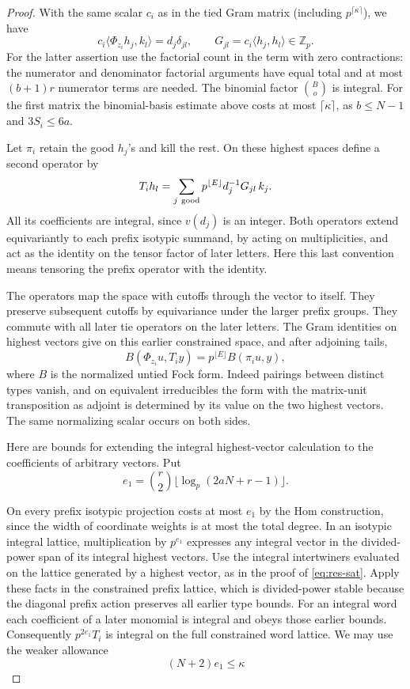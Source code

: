 \begin{proof}
With the same scalar \(c_i\) as in the tied Gram matrix
(including \(p^{\lceil\kappa\rceil}\)), we have
\[
 c_i \langle\Phi_{z_i}h_j,k_l\rangle=d_j\delta_{jl},
 \qquad G_{jl}=c_i\langle h_j,h_l\rangle\in\mathbb Z_p.
\]
For the latter assertion use the factorial count in the term
with zero contractions: the numerator and denominator factorial
arguments have equal total and at most \((b+1)r\) numerator
terms are needed. The binomial factor \(\binom Bo\) is integral.
For the first matrix the binomial-basis estimate above costs at
most \(\lceil\kappa\rceil\), as \(b\le N-1\) and \(3S_i\le6a\).

Let \(\pi_i\) retain the good \(h_j\)'s and kill the rest.
On these highest spaces define a second operator by
\[
            T_i h_l=\sum_{j\ {\rm good}}
                   p^{\lfloor E\rfloor}d_j^{-1}G_{jl}\,k_j .
\]
All its coefficients are integral, since \(v(d_j)\) is an integer.
Both operators extend equivariantly to each prefix isotypic
summand, by acting on multiplicities, and act as the identity
on the tensor factor of later letters. Here this last convention
means tensoring the prefix operator with the identity.

The
operators map the space with cutoffs through the vector to itself.
They preserve subsequent cutoffs by equivariance under the
larger prefix groups. They commute with all later tie operators
on the later letters. The Gram identities on highest vectors
give on this earlier constrained space, and after adjoining tails,
\[
     B(\Phi_{z_i}u,T_i y)
                   =p^{\lfloor E\rfloor}B(\pi_i u,y),
\]
where \(B\) is the normalized untied Fock form. Indeed pairings
between distinct types vanish, and on equivalent irreducibles
the form with the matrix-unit transposition as adjoint is
determined by its value on the two highest vectors. The same
normalizing scalar occurs on both sides.

Here are bounds for extending the integral highest-vector
calculation to the coefficients of arbitrary vectors. Put
\[
 e_1=\binom r2\lfloor\log_p(2aN+r-1)\rfloor.
\]

On every prefix isotypic projection costs at most \(e_1\) by the
Hom construction, since the width of coordinate weights is at
most the total degree. In an isotypic integral lattice,
multiplication by \(p^{e_1}\) expresses any integral vector
in the divided-power span of its integral highest vectors.
Use the integral intertwiners evaluated on the lattice generated
by a highest vector, as in the proof of \eqref{eq:res-sat}.
Apply these facts in the constrained prefix lattice, which is
divided-power stable because the diagonal prefix action preserves
all earlier type bounds. For an integral word each coefficient
of a later monomial is integral and obeys those earlier bounds.
Consequently \(p^{2e_1}T_i\) is integral on the full constrained
word lattice. We may use the weaker allowance
\[
 (N+2)e_1\le\kappa
\]


\end{proof}
